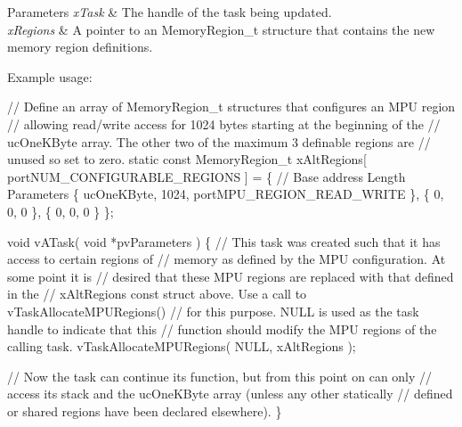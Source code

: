 \begin{DoxyParams}{Parameters}
{\em x\+Task} & The handle of the task being updated.\\
\hline
{\em x\+Regions} & A pointer to an Memory\+Region\+\_\+t structure that contains the new memory region definitions.\\
\hline
\end{DoxyParams}
Example usage\+: 
\begin{DoxyPre}
// Define an array of MemoryRegion\_t structures that configures an MPU region
// allowing read/write access for 1024 bytes starting at the beginning of the
// ucOneKByte array.  The other two of the maximum 3 definable regions are
// unused so set to zero.
static const MemoryRegion\_t xAltRegions[ portNUM\_CONFIGURABLE\_REGIONS ] =
\{
    // Base address     Length      Parameters
    \{ ucOneKByte,       1024,       portMPU\_REGION\_READ\_WRITE \},
    \{ 0,                0,          0 \},
    \{ 0,                0,          0 \}
\};\end{DoxyPre}



\begin{DoxyPre}void vATask( void *pvParameters )
\{
    // This task was created such that it has access to certain regions of
    // memory as defined by the MPU configuration.  At some point it is
    // desired that these MPU regions are replaced with that defined in the
    // xAltRegions const struct above.  Use a call to vTaskAllocateMPURegions()
    // for this purpose.  NULL is used as the task handle to indicate that this
    // function should modify the MPU regions of the calling task.
    vTaskAllocateMPURegions( NULL, xAltRegions );\end{DoxyPre}



\begin{DoxyPre}    // Now the task can continue its function, but from this point on can only
    // access its stack and the ucOneKByte array (unless any other statically
    // defined or shared regions have been declared elsewhere).
\}
   \end{DoxyPre}
 